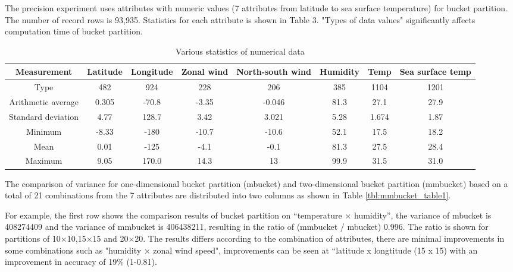 The precision experiment uses attributes with numeric values (7 attributes from latitude to sea surface temperature) for bucket partition. The number of record rows is 93,935. Statistics for each attribute is shown in Table 3. "Types of data values" significantly affects computation time of bucket partition.


\begin{table}[hbt]
\begin{center}
\caption{Various statistics of numerical data}
{\footnotesize
\begin{tabular}{c|c|c|c|c|c|c|c} \hline
Measurement & Latitude& Longitude & Zonal wind & North-south wind & Humidity & Temp & Sea surface temp\\ \hline
Type & 482& 924& 228& 206& 385& 1104& 1201\\
Arithmetic average& 0.305& -70.8& -3.35& -0.046& 81.3& 27.1& 27.9\\
Standard deviation & 4.77& 128.7& 3.42& 3.021& 5.28& 1.674& 1.87\\
Minimum & -8.33& -180& -10.7& -10.6& 52.1& 17.5& 18.2\\
Mean & 0.01& -125& -4.1& -0.1& 81.3& 27.5& 28.4\\
Maximum& 9.05& 170.0& 14.3& 13& 99.9& 31.5& 31.0\\ \hline
\end{tabular}
}
\end{center}
\end{table}

The comparison of variance for one-dimensional bucket partition (mbucket) and two-dimensional bucket partition (mmbucket) based on a total of 21 combinations from the 7 attributes are distributed into two columns as shown in Table \ref{tbl:mmbucket_table1}. 

For example, the first row shows the comparison results of bucket partition on “temperature × humidity”, the variance of mbucket is 408274409 and the variance of mmbucket is 406438211, resulting in the ratio of (mmbucket / mbucket) 0.996. The ratio is shown for partitions of 10×10,15×15 and 20×20. The results differs according to the combination of attributes, there are minimal improvements in some combinations such as "humidity × zonal wind speed", improvements can be seen at “latitude x longtitude (15 x 15) with an improvement in accuracy of 19\% (1-0.81).

